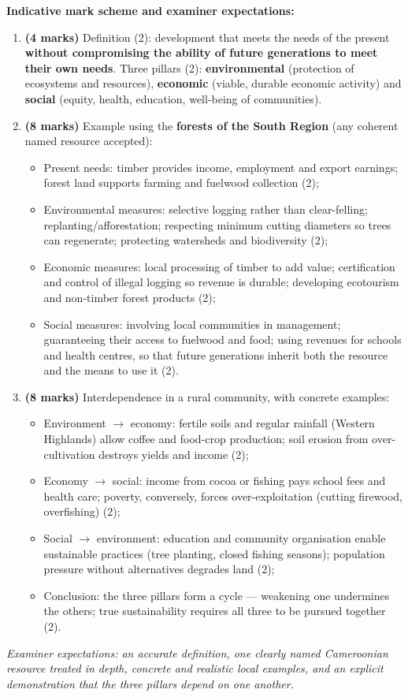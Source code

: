 \documentclass[11pt]{article}
\begin{document}
\begin{corrige}
\textbf{Indicative mark scheme and examiner expectations:}
\begin{enumerate}
\item \textbf{(4 marks)} Definition (2): development that meets the needs of the present \textbf{without compromising the ability of future generations to meet their own needs}. Three pillars (2): \textbf{environmental} (protection of ecosystems and resources), \textbf{economic} (viable, durable economic activity) and \textbf{social} (equity, health, education, well-being of communities).
\item \textbf{(8 marks)} Example using the \textbf{forests of the South Region} (any coherent named resource accepted):
\begin{itemize}
\item Present needs: timber provides income, employment and export earnings; forest land supports farming and fuelwood collection (2);
\item Environmental measures: selective logging rather than clear-felling; replanting/afforestation; respecting minimum cutting diameters so trees can regenerate; protecting watersheds and biodiversity (2);
\item Economic measures: local processing of timber to add value; certification and control of illegal logging so revenue is durable; developing ecotourism and non-timber forest products (2);
\item Social measures: involving local communities in management; guaranteeing their access to fuelwood and food; using revenues for schools and health centres, so that future generations inherit both the resource and the means to use it (2).
\end{itemize}
\item \textbf{(8 marks)} Interdependence in a rural community, with concrete examples:
\begin{itemize}
\item Environment $\rightarrow$ economy: fertile soils and regular rainfall (Western Highlands) allow coffee and food-crop production; soil erosion from over-cultivation destroys yields and income (2);
\item Economy $\rightarrow$ social: income from cocoa or fishing pays school fees and health care; poverty, conversely, forces over-exploitation (cutting firewood, overfishing) (2);
\item Social $\rightarrow$ environment: education and community organisation enable sustainable practices (tree planting, closed fishing seasons); population pressure without alternatives degrades land (2);
\item Conclusion: the three pillars form a cycle — weakening one undermines the others; true sustainability requires all three to be pursued together (2).
\end{itemize}
\end{enumerate}
\emph{Examiner expectations: an accurate definition, one clearly named Cameroonian resource treated in depth, concrete and realistic local examples, and an explicit demonstration that the three pillars depend on one another.}
\end{corrige}
\end{document}

